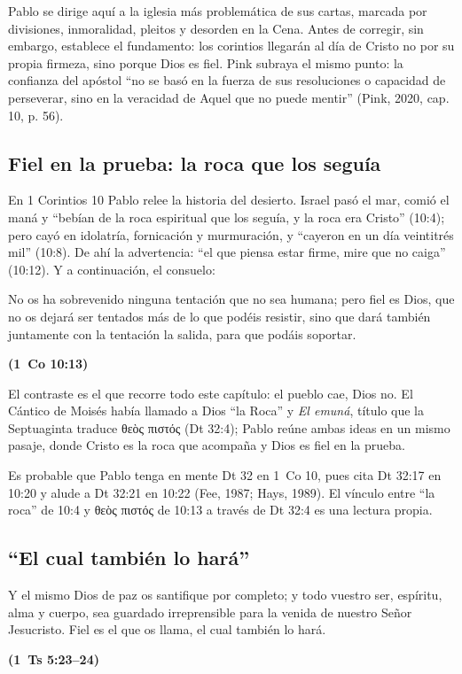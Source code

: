 \documentclass[11pt,letterpaper]{article}
\newcommand{\grc}[1]{\foreignlanguage{ancientgreek}{#1}}
\newcommand{\fuente}[1]{\par\hfill{\upshape\bfseries\small\textcolor{azul}{#1}}}
\begin{document}
Pablo se dirige aquí a la iglesia más problemática de sus cartas, marcada por divisiones, inmoralidad, pleitos y desorden en la Cena. Antes de corregir, sin embargo, establece el fundamento: los corintios llegarán al día de Cristo no por su propia firmeza, sino porque Dios es fiel. Pink subraya el mismo punto: la confianza del apóstol ``no se basó en la fuerza de sus resoluciones o capacidad de perseverar, sino en la veracidad de Aquel que no puede mentir'' (Pink, 2020, cap. 10, p. 56).

\subsection{Fiel en la prueba: la roca que los seguía}
En 1 Corintios 10 Pablo relee la historia del desierto. Israel pasó el mar, comió el maná y ``bebían de la roca espiritual que los seguía, y la roca era Cristo'' (10:4); pero cayó en idolatría, fornicación y murmuración, y ``cayeron en un día veintitrés mil'' (10:8). De ahí la advertencia: ``el que piensa estar firme, mire que no caiga'' (10:12). Y a continuación, el consuelo:

\begin{cita}No os ha sobrevenido ninguna tentación que no sea humana; pero fiel es Dios, que no os dejará ser tentados más de lo que podéis resistir, sino que dará también juntamente con la tentación la salida, para que podáis soportar.\fuente{(1~Co 10:13)}\end{cita}

El contraste es el que recorre todo este capítulo: el pueblo cae, Dios no. El Cántico de Moisés había llamado a Dios ``la Roca'' y \emph{El emuná}, título que la Septuaginta traduce \grc{θεὸς πιστός} (Dt 32:4); Pablo reúne ambas ideas en un mismo pasaje, donde Cristo es la roca que acompaña y Dios es fiel en la prueba.

\begin{nota}[Precisión]
Es probable que Pablo tenga en mente Dt 32 en 1~Co 10, pues cita Dt 32:17 en 10:20 y alude a Dt 32:21 en 10:22 (Fee, 1987; Hays, 1989). El vínculo entre ``la roca'' de 10:4 y \grc{θεὸς πιστός} de 10:13 a través de Dt 32:4 es una lectura propia.
\end{nota}

\subsection{``El cual también lo hará''}
\begin{cita}Y el mismo Dios de paz os santifique por completo; y todo vuestro ser, espíritu, alma y cuerpo, sea guardado irreprensible para la venida de nuestro Señor Jesucristo. Fiel es el que os llama, el cual también lo hará.\fuente{(1~Ts 5:23--24)}\end{cita}
\end{document}
